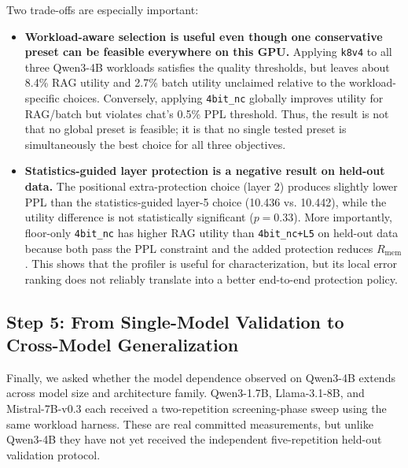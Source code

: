 \documentclass[10pt]{article}
\begin{document}
Two trade-offs are especially important:
\begin{itemize}\itemsep=1pt
\item \textbf{Workload-aware selection is useful even though one conservative preset can be feasible everywhere on this GPU.} Applying \texttt{k8v4} to all three Qwen3-4B workloads satisfies the quality thresholds, but leaves about 8.4\% RAG utility and 2.7\% batch utility unclaimed relative to the workload-specific choices. Conversely, applying \texttt{4bit\_nc} globally improves utility for RAG/batch but violates chat's 0.5\% PPL threshold. Thus, the result is not that no global preset is feasible; it is that no single tested preset is simultaneously the best choice for all three objectives.
\item \textbf{Statistics-guided layer protection is a negative result on held-out data.} The positional extra-protection choice (layer 2) produces slightly lower PPL than the statistics-guided layer-5 choice (10.436 vs. 10.442), while the utility difference is not statistically significant ($p=0.33$). More importantly, floor-only \texttt{4bit\_nc} has higher RAG utility than \texttt{4bit\_nc+L5} on held-out data because both pass the PPL constraint and the added protection reduces $R_{\mathrm{mem}}$. This shows that the profiler is useful for characterization, but its local error ranking does not reliably translate into a better end-to-end protection policy.
\end{itemize}

\subsection*{Step 5: From Single-Model Validation to Cross-Model Generalization}
Finally, we asked whether the model dependence observed on Qwen3-4B extends across model size and architecture family. Qwen3-1.7B, Llama-3.1-8B, and Mistral-7B-v0.3 each received a two-repetition screening-phase sweep using the same workload harness. These are real committed measurements, but unlike Qwen3-4B they have not yet received the independent five-repetition held-out validation protocol.
\end{document}
